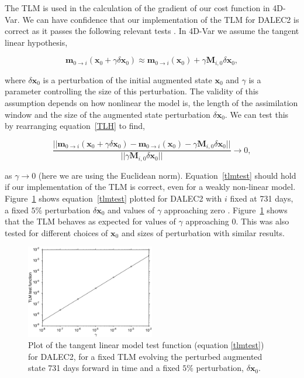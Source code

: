 \documentclass[review]{elsarticle}
\begin{document}
The TLM is used in the calculation of the gradient of our cost function in 4D-Var. We can have confidence that our implementation of the TLM for DALEC2 is correct as it passes the following relevant tests \citep{Li1994}. In 4D-Var we assume the tangent linear hypothesis,
\begin{linenomath}
\begin{equation}
\textbf{m}_{0\rightarrow i}(\mathbf{x}_0+\gamma \delta\mathbf{x}_0) \approx \textbf{m}_{0 \rightarrow i}(\mathbf{x}_0) +\gamma \mathbf{M}_{i,0} \delta\mathbf{x}_0, \label{TLH}
\end{equation}
\end{linenomath}
where $\delta\mathbf{x}_0$ is a perturbation of the initial augmented state $\textbf{x}_{0}$ and $\gamma$ is a parameter controlling the size of this perturbation. The validity of this assumption depends on how nonlinear the model is, the length of the assimilation window and the size of the augmented state perturbation $\delta\mathbf{x}_0$. We can test this by rearranging equation~\eqref{TLH} to find,
\begin{linenomath}
\begin{equation}
\frac{||\textbf{m}_{0\rightarrow i}(\mathbf{x}_0+\gamma \delta\mathbf{x}_0) - \textbf{m}_{0 \rightarrow i}(\mathbf{x}_0)-\gamma\mathbf{M}_{i,0}\delta\mathbf{x}_0||}{||\gamma\mathbf{M}_{i,0}\delta\mathbf{x}_0||} \rightarrow 0, \label{tlmtest}
\end{equation}
\end{linenomath}
as $\gamma \rightarrow 0$ (here we are using the Euclidean norm). Equation~\eqref{tlmtest} should hold if our implementation of the TLM is correct, even for a weakly non-linear model. Figure~\ref{fig:tlm} shows equation~\eqref{tlmtest} plotted for DALEC2 with $i$ fixed at 731 days, a fixed $5\%$ perturbation $\delta\mathbf{x}_0$ and values of $\gamma$ approaching zero . Figure~\ref{fig:tlm} shows that the TLM behaves as expected for values of $\gamma$ approaching $0$. This was also tested for different choices of $\textbf{x}_{0}$ and sizes of perturbation with similar results.


\begin{figure}[ht]
    \centering
    \includegraphics[width=0.5\textwidth]{linmoderr.eps}
    \caption{Plot of the tangent linear model test function (equation \eqref{tlmtest}) for DALEC2, for a fixed TLM evolving the perturbed augmented state 731 days forward in time and a fixed $5\%$ perturbation, $\delta \textbf{x}_0$.}
    \label{fig:tlm}
\end{figure}
\end{document}
